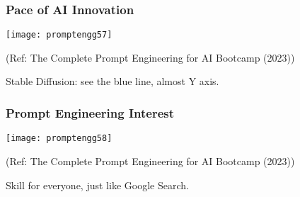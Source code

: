 






\begin{frame}[fragile]\frametitle{Pace of AI Innovation}

\begin{center}
\texttt{[image: promptengg57]}

{\tiny (Ref: The Complete Prompt Engineering for AI Bootcamp (2023))}

\end{center}

Stable Diffusion: see the blue line, almost Y axis.
				
\end{frame}

\begin{frame}[fragile]\frametitle{Prompt Engineering Interest}

\begin{center}
\texttt{[image: promptengg58]}

{\tiny (Ref: The Complete Prompt Engineering for AI Bootcamp (2023))}

\end{center}		

Skill for everyone, just like Google Search.
		
\end{frame}

